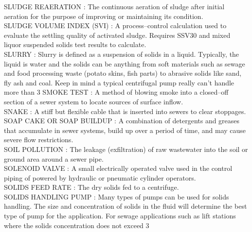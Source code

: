 \vspace{0.15cm}
SLUDGE REAERATION :   The continuous aeration of sludge after initial aeration for the purpose of improving or maintaining its condition.\\
\vspace{0.15cm}
SLUDGE VOLUME INDEX (SVI) :  A process–control calculation used to evaluate the settling quality of activated sludge. Requires SSV30 and mixed liquor suspended solids test results to calculate. \\
\vspace{0.15cm}
SLURRY :   Slurry is defined as a suspension of solids in a liquid. Typically, the liquid is water and the solids can be anything from soft materials such as sewage and food processing waste (potato skins, fish parts) to abrasive solids like sand, fly ash and coal. Keep in mind a typical centrifugal pump really can’t handle more than 3%
\vspace{0.15cm}
SMOKE TEST :  A method of blowing smoke into a closed–off section of a sewer system to locate sources of surface inflow. \\
\vspace{0.15cm}
SNAKE :  A stiff but flexible cable that is inserted into sewers to clear stoppages. \\
\vspace{0.15cm}
SOAP CAKE OR SOAP BUILDUP :  A combination of detergents and greases that accumulate in sewer systems, build up over a period of time, and may cause severe flow restrictions. \\
\vspace{0.15cm}
SOIL POLLUTION :  The leakage (exfiltration) of raw wastewater into the soil or ground area around a sewer pipe. \\
\vspace{0.15cm}
SOLENOID VALVE :   A small electrically operated valve used in the control piping of powered by hydraulic or pneumatic cylinder operators.\\
\vspace{0.15cm}
SOLIDS FEED RATE :  The dry solids fed to a centrifuge.\\
\vspace{0.15cm}
SOLIDS HANDLING PUMP :   Many types of pumps can be used for solids handling. The size and concentration of solids in the fluid will determine the best type of pump for the application. For sewage applications such as lift stations where the solids concentration does not exceed 3%
